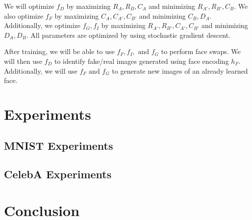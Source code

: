 \documentclass{article}
\begin{document}
We will optimize $f_D$ by maximizing $R_A, R_B, C_A$ and minimizing $R_{A'}, R_{B'}, C_B$. We also optimize $f_F$ by maximizing $C_A, C_{A'}, C_{B'}$ and minimizing $C_B, D_A$. Additionally, we optimize $f_G, f_I$ by maximizing $R_{A'}, R_{B'}, C_{A'}, C_{B'}$ and minimizing $D_A, D_B$. All parameters are optimized by using stochastic gradient descent. 

After training, we will be able to use $f_F, f_I, \text{ and } f_G$ to perform face swaps. We will then use $f_D$ to identify fake/real images generated using face encoding $h_F$. Additionally, we will use $f_F \text{ and } f_G$ to generate new images of an already learned face.

\section{Experiments}

\subsection{MNIST Experiments}

\subsection{CelebA Experiments}

\section{Conclusion}

\pagebreak



\end{document}
